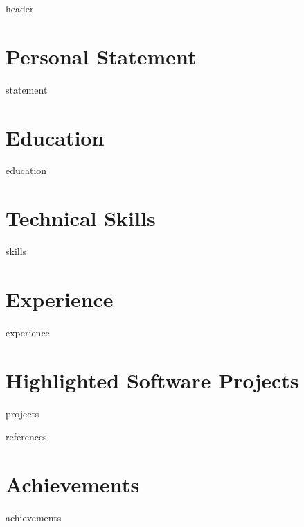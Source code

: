 \documentclass[letterpaper,10pt]{article}
\begin{document}
{{header}}

\section{Personal Statement}
{{statement}}

\section{Education}
{{education}}

\section{Technical Skills}
{{skills}}

\section{Experience}
{{experience}}

\section{Highlighted Software Projects}
{{projects}}



{{references}}

\section{Achievements}
{{achievements}}
\end{document}
